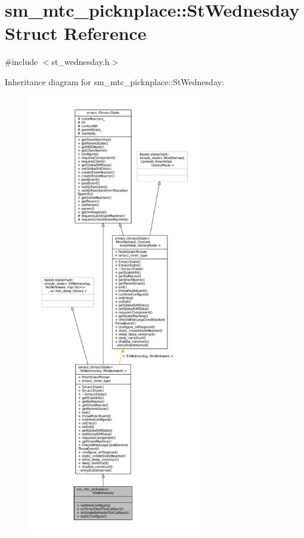 \hypertarget{structsm__mtc__picknplace_1_1StWednesday}{}\section{sm\+\_\+mtc\+\_\+picknplace\+:\+:St\+Wednesday Struct Reference}
\label{structsm__mtc__picknplace_1_1StWednesday}


{\ttfamily \#include $<$st\+\_\+wednesday.\+h$>$}



Inheritance diagram for sm\+\_\+mtc\+\_\+picknplace\+:\+:St\+Wednesday\+:
\nopagebreak
\begin{figure}[H]
\begin{center}
\leavevmode
\includegraphics[height=550pt]{structsm__mtc__picknplace_1_1StWednesday__inherit__graph}
\end{center}
\end{figure}



